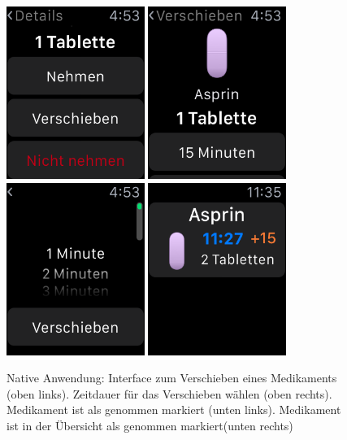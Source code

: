 \begin{figure}
	\caption{Native Anwendung: Interface zum Verschieben eines Medikaments (oben links). Zeitdauer für das Verschieben wählen (oben rechts). Medikament ist als genommen markiert (unten links). Medikament ist in der Übersicht als genommen markiert(unten rechts)}
	\label{fig:watch-app-delay}
	\centering
	\includegraphics[width=0.4\textwidth]{04_realisation/screenshots/watch/delay01.png}
	\includegraphics[width=0.4\textwidth]{04_realisation/screenshots/watch/delay02.png}
	\includegraphics[width=0.4\textwidth]{04_realisation/screenshots/watch/delay03.png}
	\includegraphics[width=0.4\textwidth]{04_realisation/screenshots/watch/delay04.png}
\end{figure}


